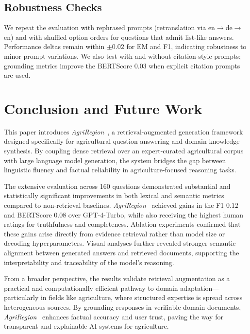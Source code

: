 \documentclass{ieeeaccess}
\newcommand{\AgriRegion}{\textit{AgriRegion}}
\begin{document}
\subsection{Robustness Checks}
We repeat the evaluation with rephrased prompts (retranslation via en$\rightarrow$de$\rightarrow$en) and with shuffled option orders for questions that admit list-like answers.
Performance deltas remain within $\pm0.02$ for EM and F1, indicating robustness to minor prompt variations.
We also test with and without citation-style prompts; grounding metrics improve the BERTScore $0.03$ when explicit citation prompts are used.

\section{Conclusion and Future Work}
\label{sec:conclusion}
This paper introduces \AgriRegion~, a retrieval-augmented generation framework designed specifically for agricultural question answering and domain knowledge synthesis. 
By coupling dense retrieval over an expert-curated agricultural corpus with large language model generation, the system bridges the gap between linguistic fluency and factual reliability in agriculture-focused reasoning tasks.

The extensive evaluation across 160 questions demonstrated substantial and statistically significant improvements in both lexical and semantic metrics compared to non-retrieval baselines.
\AgriRegion~ achieved gains in the F1  $0.12$ and BERTScore $0.08$ over GPT-4-Turbo, while also receiving the highest human ratings for truthfulness and completeness.
Ablation experiments confirmed that these gains arise directly from evidence retrieval rather than model size or decoding hyperparameters.
Visual analyses further revealed stronger semantic alignment between generated answers and retrieved documents, supporting the interpretability and traceability of the model’s reasoning.

From a broader perspective, the results validate retrieval augmentation as a practical and computationally efficient pathway to domain adaptation—particularly in fields like agriculture, where structured expertise is spread across heterogeneous sources.
By grounding responses in verifiable domain documents, \AgriRegion~ enhances factual accuracy and user trust, paving the way for transparent and explainable AI systems for agriculture.
\end{document}
